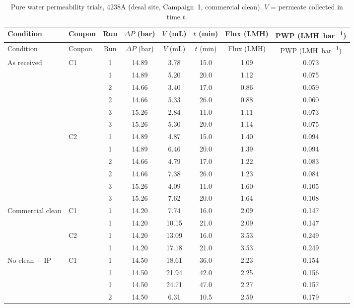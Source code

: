{\footnotesize
\begin{longtable}{llcccccc}
  \caption{Pure water permeability trials, 4238A (desal site, Campaign~1, commercial clean). $V$ = permeate collected in time $t$.}
  \label{tab:app-pwp-4238A}\\
  \toprule
  Condition & Coupon & Run & $\Delta P$ (\unit{bar}) & $V$ (\unit{mL}) & $t$ (\unit{min}) & Flux (\unit{LMH}) & PWP (\unit{LMH.bar^{-1}}) \\
  \midrule
  \endfirsthead
  \toprule
  Condition & Coupon & Run & $\Delta P$ (\unit{bar}) & $V$ (\unit{mL}) & $t$ (\unit{min}) & Flux (\unit{LMH}) & PWP (\unit{LMH.bar^{-1}}) \\
  \midrule
  \endhead
  \bottomrule
  \endfoot
  As received & C1 & 1 & 14.89 & 3.78 & 15.0 & 1.09 & 0.073 \\
   &  & 1 & 14.89 & 5.20 & 20.0 & 1.12 & 0.075 \\
   &  & 2 & 14.66 & 3.40 & 17.0 & 0.86 & 0.059 \\
   &  & 2 & 14.66 & 5.33 & 26.0 & 0.88 & 0.060 \\
   &  & 3 & 15.26 & 2.84 & 11.0 & 1.11 & 0.073 \\
   &  & 3 & 15.26 & 5.30 & 20.0 & 1.14 & 0.075 \\
  \addlinespace[2pt]
   & C2 & 1 & 14.89 & 4.87 & 15.0 & 1.40 & 0.094 \\
   &  & 1 & 14.89 & 6.46 & 20.0 & 1.39 & 0.094 \\
   &  & 2 & 14.66 & 4.79 & 17.0 & 1.22 & 0.083 \\
   &  & 2 & 14.66 & 7.38 & 26.0 & 1.23 & 0.084 \\
   &  & 3 & 15.26 & 4.09 & 11.0 & 1.60 & 0.105 \\
   &  & 3 & 15.26 & 7.62 & 20.0 & 1.64 & 0.108 \\
  \midrule
  Commercial clean & C1 & 1 & 14.20 & 7.74 & 16.0 & 2.09 & 0.147 \\
   &  & 1 & 14.20 & 10.15 & 21.0 & 2.09 & 0.147 \\
  \addlinespace[2pt]
   & C2 & 1 & 14.20 & 13.09 & 16.0 & 3.53 & 0.249 \\
   &  & 1 & 14.20 & 17.18 & 21.0 & 3.53 & 0.249 \\
  \midrule
  No clean + IP & C1 & 1 & 14.50 & 18.61 & 36.0 & 2.23 & 0.154 \\
   &  & 1 & 14.50 & 21.94 & 42.0 & 2.25 & 0.156 \\
   &  & 1 & 14.50 & 24.71 & 47.0 & 2.27 & 0.157 \\
   &  & 2 & 14.50 & 6.31 & 10.5 & 2.59 & 0.179 \\

\end{longtable}}
